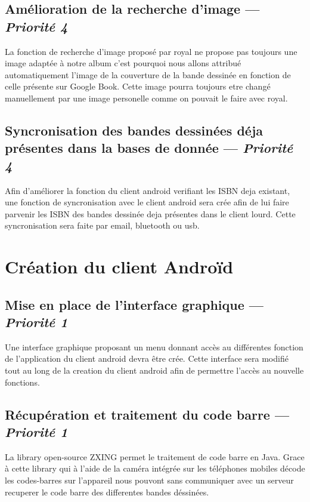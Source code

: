 \subsection[Amélioration de la recherche d'image]{Amélioration de la recherche d'image — \emph{Priorité 4}}
La fonction de recherche d'image proposé par royal ne propose pas toujours une image adaptée à notre album c'est pourquoi nous allons attribué automatiquement l'image de la couverture de la bande dessinée en fonction de celle présente sur Google Book. Cette image pourra toujours etre changé manuellement par une image personelle comme on pouvait le faire avec royal.

\subsection[Syncronisation des bandes dessinées déja présentes dans la bases de donnée]{Syncronisation des bandes dessinées déja présentes dans la bases de donnée — \emph{Priorité 4}}
Afin d'améliorer la fonction du client android verifiant les ISBN deja existant, une fonction de syncronisation avec le client android sera crée afin de lui faire parvenir les ISBN des bandes dessinée deja présentes dans le client lourd. Cette syncronisation sera faite par email, bluetooth ou usb.

\section{Création du client Androïd}


\subsection[Mise en place de l'interface graphique]{Mise en place de l'interface graphique  — \emph{Priorité 1}}
Une interface graphique proposant un menu donnant accès au différentes fonction de l'application du client android devra être crée. Cette interface sera modifié tout au long de la creation du client android afin de permettre l'accès au nouvelle fonctions.

\subsection[Récupération et traitement du code barre]{Récupération et traitement du code barre — \emph{Priorité 1}}
La library open-source ZXING permet le traitement de code barre en Java. Grace à cette library qui à l'aide de la caméra intégrée sur les téléphones mobiles décode les codes-barres sur l'appareil nous pouvont sans communiquer avec un serveur recuperer le code barre des differentes bandes déssinées.

